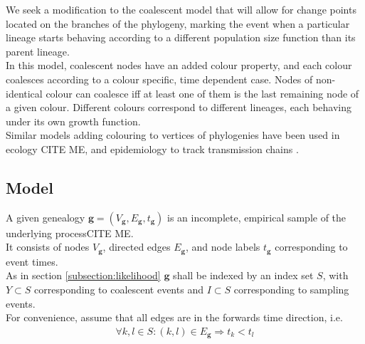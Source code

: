 \documentclass{report}
\newcommand{\CITEMISSING}{\colorbox{BurntOrange}{CITE ME}}
\theoremstyle{definition}
\begin{document}
We seek a modification to the coalescent model that will allow for change points located on the branches of the phylogeny, marking the event when a particular lineage starts behaving according to a different population size function than its parent lineage.\\

In this model, coalescent nodes have an added colour property, and each colour coalesces according to a colour specific, time dependent case. Nodes of non-identical colour can coalesce iff at least one of them is the last remaining node of a given colour.
Different colours correspond to different lineages, each behaving under its own growth function.\\

Similar models adding colouring to vertices of phylogenies have been used in ecology \CITEMISSING, and epidemiology to track transmission chains \cite{didelot_genomic_2017}.
\subsection{Model}
A given genealogy $\mathbf{g}=(V_\mathbf{g}, E_\mathbf{g}, t_\mathbf{g})$ is an incomplete, empirical sample of the underlying process\CITEMISSING.\\
It consists of nodes $V_\mathbf{g}$, directed edges $E_\mathbf{g}$, and node labels $t_\mathbf{g}$ corresponding to event times.\\
As in section \ref{subsection:likelihood} $\mathbf{g}$ shall be indexed by an index set $S$, with $Y\subset S$ corresponding to coalescent events and $I\subset S$ corresponding to sampling events.\\
For convenience, assume that all edges are in the forwards time direction, i.e. 
\begin{gather*}
\forall k,l \in S: (k,l)\in E_\mathbf{g} \Rightarrow t_k<t_l
\end{gather*}
\end{document}
